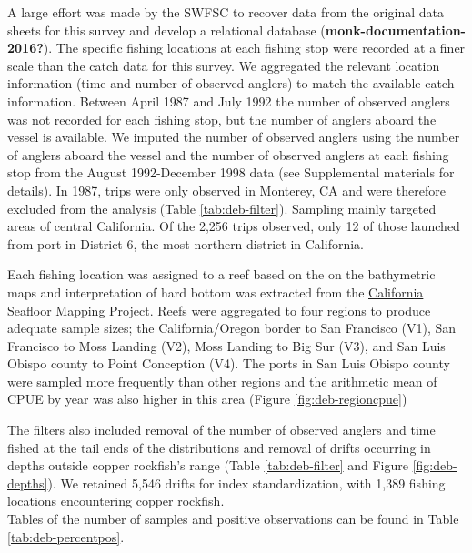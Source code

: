 \documentclass[11pt,
  english,
  letterpaper,
]{article}
\begin{document}
A large effort was made by the SWFSC to recover data from the original data sheets for this survey and develop a relational database (\textbf{monk-documentation-2016?}). The specific fishing locations at each fishing stop were recorded at a finer scale than the catch data for this survey. We aggregated the relevant location information (time and number of observed anglers) to match the available catch information. Between April 1987 and July 1992 the number of observed anglers was not recorded for each fishing stop, but the number of anglers aboard the vessel is available. We imputed the number of observed anglers using the number of anglers aboard the vessel and the number of observed anglers at each fishing stop from the August 1992-December 1998 data (see Supplemental materials for details). In 1987, trips were only observed in Monterey, CA and were therefore excluded from the analysis (Table \ref{tab:deb-filter}). Sampling mainly targeted areas of central California. Of the 2,256 trips observed, only 12 of those launched from port in District 6, the most northern district in California.

Each fishing location was assigned to a reef based on the on the bathymetric maps and interpretation of hard bottom was extracted from the \href{http://seafloor.otterlabs.org/index.html}{California Seafloor Mapping Project}. Reefs were aggregated to four regions to produce adequate sample sizes; the California/Oregon border to San Francisco (V1), San Francisco to Moss Landing (V2), Moss Landing to Big Sur (V3), and San Luis Obispo county to Point Conception (V4). The ports in San Luis Obispo county were sampled more frequently than other regions and the arithmetic mean of CPUE by year was also higher in this area (Figure \ref{fig:deb-regioncpue})

The filters also included removal of the number of observed anglers and time fished at the tail ends of the distributions and removal of drifts occurring in depths outside copper rockfish's range (Table \ref{tab:deb-filter} and Figure \ref{fig:deb-depths}). We retained 5,546 drifts for index standardization, with 1,389 fishing locations encountering copper rockfish.\\
Tables of the number of samples and positive observations can be found in Table \ref{tab:deb-percentpos}.
\end{document}

